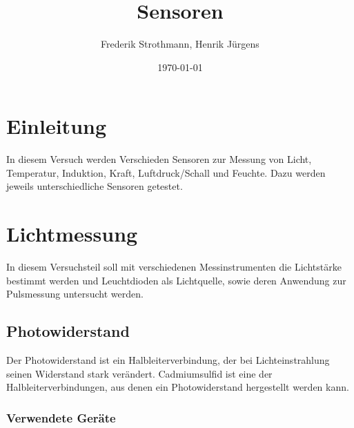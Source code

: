 \documentclass[12pt,a4paper]{article}
\title{Sensoren}
\author{Frederik Strothmann, Henrik Jürgens}
\date{\today}
\begin{document}
\maketitle
\newpage
\tableofcontents
\newpage
\section{Einleitung}

In diesem Versuch werden Verschieden Sensoren zur Messung von Licht, Temperatur, Induktion, Kraft, Luftdruck/Schall und Feuchte. Dazu werden jeweils unterschiedliche Sensoren getestet.


\section{Lichtmessung}

In diesem Versuchsteil soll mit verschiedenen Messinstrumenten die Lichtstärke bestimmt werden und Leuchtdioden als Lichtquelle, sowie deren Anwendung zur Pulsmessung untersucht werden.

\subsection{Photowiderstand}

Der Photowiderstand ist ein Halbleiterverbindung, der bei Lichteinstrahlung seinen Widerstand stark verändert. Cadmiumsulfid ist eine der Halbleiterverbindungen, aus denen ein Photowiderstand hergestellt werden kann.

\subsubsection*{Verwendete Geräte}
\end{document}
